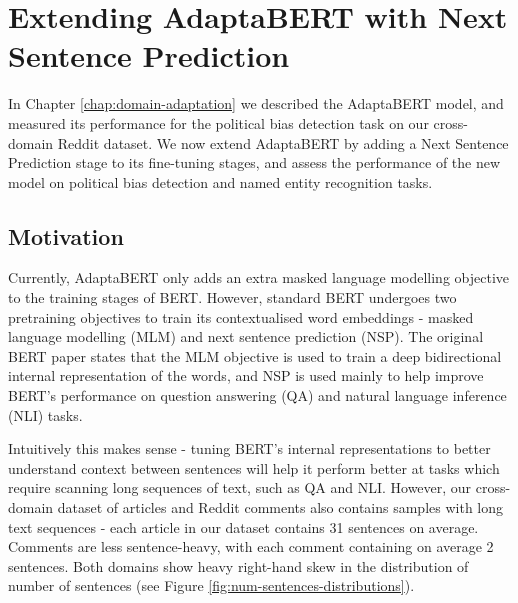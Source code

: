 \chapter{Extending AdaptaBERT with Next Sentence Prediction} \label{chap:extending-adaptabert}

In Chapter \ref{chap:domain-adaptation} we described the AdaptaBERT model, and measured its performance for the political bias detection task on our cross-domain Reddit dataset. We now extend AdaptaBERT by adding a Next Sentence Prediction stage to its fine-tuning stages, and assess the performance of the new model on political bias detection and named entity recognition tasks.

\section{Motivation}

Currently, AdaptaBERT only adds an extra masked language modelling objective to the training stages of BERT. However, standard BERT undergoes two pretraining objectives to train its contextualised word embeddings - masked language modelling (MLM) and next sentence prediction (NSP). The original BERT paper \cite{bert} states that the MLM objective is used to train a deep bidirectional internal representation of the words, and NSP is used mainly to help improve BERT's performance on question answering (QA) and natural language inference (NLI) tasks.

Intuitively this makes sense - tuning BERT's internal representations to better understand context between sentences will help it perform better at tasks which require scanning long sequences of text, such as QA and NLI. However, our cross-domain dataset of articles and Reddit comments also contains samples with long text sequences - each article in our dataset contains 31 sentences on average. Comments are less sentence-heavy, with each comment containing on average 2 sentences. Both domains show heavy right-hand skew in the distribution of number of sentences (see Figure \ref{fig:num-sentences-distributions}).

